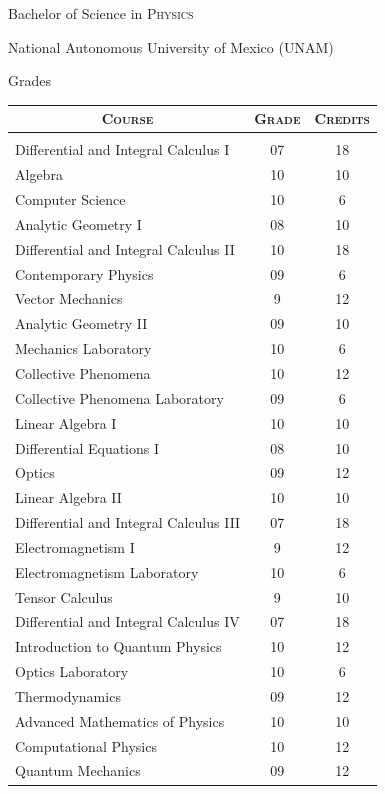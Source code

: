 \documentclass[a4paper,10pt]{article} %
\begin{document}
\newpage
\par{\centering\LARGE \hypertarget{grdsbach}{Bachelor of Science in \textsc{Physics}}\par}\par{\centering\Large National Autonomous University of Mexico (UNAM)\par}\large{\centering Grades\par}\small
\bigskip
\bigskip
\bigskip
\begin{center}
\begin{tabular}{lcc}
\multicolumn{1}{c}{\textsc{Course}} & \textsc{Grade}&\textsc{Credits}\\ \hline \\
Differential and Integral Calculus I & 07 & 18\\
Algebra & 10 & 10\\
Computer Science & 10 & 6\\
Analytic Geometry I & 08 & 10\\
Differential and Integral Calculus II & 10 & 18\\ 
Contemporary Physics & 09 & 6\\
Vector Mechanics & 9 & 12\\ 
Analytic Geometry II & 09 & 10\\
Mechanics Laboratory & 10 & 6\\
Collective Phenomena & 10 & 12\\
Collective Phenomena Laboratory & 09 & 6\\
Linear Algebra I & 10 & 10\\ 
Differential Equations I & 08 & 10\\
Optics & 09 & 12\\
Linear Algebra II & 10 & 10\\
Differential and Integral Calculus III & 07 & 18\\
Electromagnetism I & 9 & 12\\
Electromagnetism Laboratory & 10 & 6\\
Tensor Calculus & 9 & 10\\
Differential and Integral Calculus IV & 07 & 18\\
Introduction to Quantum Physics & 10 & 12\\
Optics Laboratory & 10 & 6\\
Thermodynamics & 09 & 12\\
Advanced Mathematics of Physics & 10 & 10\\
Computational Physics & 10 & 12\\
Quantum Mechanics & 09 & 12\\

\end{tabular}
\end{center}
\end{document}

